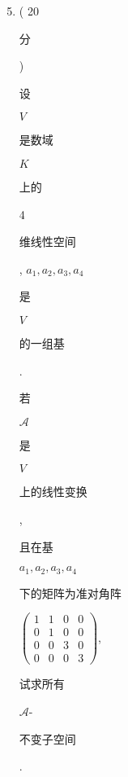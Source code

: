 \documentclass[10pt]{article}
\begin{document}
\begin{enumerate}
  \setcounter{enumi}{4}
  \item ( 20 \begin{CJK}{UTF8}{mj}分\end{CJK}) \begin{CJK}{UTF8}{mj}设\end{CJK} $V$ \begin{CJK}{UTF8}{mj}是数域\end{CJK} $K$ \begin{CJK}{UTF8}{mj}上的\end{CJK} 4 \begin{CJK}{UTF8}{mj}维线性空间\end{CJK}, $a_{1}, a_{2}, a_{3}, a_{4}$ \begin{CJK}{UTF8}{mj}是\end{CJK} $V$ \begin{CJK}{UTF8}{mj}的一组基\end{CJK}. \begin{CJK}{UTF8}{mj}若\end{CJK} $\mathcal{A}$ \begin{CJK}{UTF8}{mj}是\end{CJK} $V$ \begin{CJK}{UTF8}{mj}上的线性变换\end{CJK}, \begin{CJK}{UTF8}{mj}且在基\end{CJK} $a_{1}, a_{2}, a_{3}, a_{4}$ \begin{CJK}{UTF8}{mj}下的矩阵为准对角阵\end{CJK} $\left(\begin{array}{cccc}1 & 1 & 0 & 0 \\ 0 & 1 & 0 & 0 \\ 0 & 0 & 3 & 0 \\ 0 & 0 & 0 & 3\end{array}\right)$, \begin{CJK}{UTF8}{mj}试求所有\end{CJK} $\mathcal{A}$-\begin{CJK}{UTF8}{mj}不变子空间\end{CJK}.


\end{enumerate}
\end{document}
